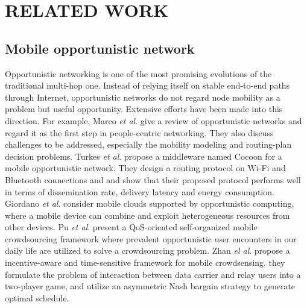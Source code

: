 \documentclass[journal]{IEEEtran}
\begin{document}
\section{RELATED WORK}

\subsection{Mobile opportunistic network}
Opportunistic networking is one of the most promising evolutions of the traditional multi-hop one. 
Instead of relying itself on stable end-to-end paths through Internet, opportunistic networks do not regard node mobility as a problem but useful opportunity. 
Extensive efforts have been made into this direction. For example, Marco \emph{et al}. \cite{Conti2014} give a review of opportunistic networks and regard it as the first step in people-centric networking. They also discuss challenges to be addressed, especially the mobility modeling and routing-plan decision problems.
Turkes \emph{et al}. \cite{turkes2016cocoon} propose a middleware named Cocoon for a mobile opportunistic network. They design a routing protocol on Wi-Fi and Bluetooth connections and and show that their proposed protocol performs well in terms of dissemination rate, delivery latency and energy consumption.
Giordano \emph{et al}. \cite{giordano2011human} consider mobile clouds supported by opportunistic computing, where a mobile device can combine and exploit heterogeneous resources from other devices.
Pu \emph{et al}. \cite{Pu2017crowd} present a QoS-oriented self-organized mobile crowdsourcing framework where prevalent opportunistic user encounters in our daily life are utilized to solve a crowdsourcing problem.
Zhan \emph{el al}. \cite{zhan2017time} propose a incentive-aware and time-sensitive framework for mobile crowdsensing. they formulate the problem of interaction between data carrier and relay users into a two-player game, and utilize an asymmetric Nash bargain strategy to generate optimal schedule.
\end{document}
